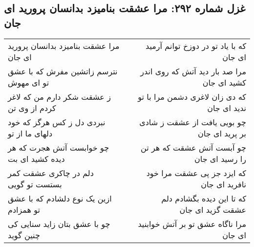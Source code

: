 \begin{center}
\section*{غزل شماره ۲۹۲: مرا عشقت بنامیزد بدانسان پرورید ای جان}
\label{sec:292}
\begin{longtable}{l p{0.5cm} r}
مرا عشقت بنامیزد بدانسان پرورید ای جان
&&
که با یاد تو در دوزخ توانم آرمید ای جان
\\
نترسم زاتشین مفرش که با عشق تو ای مهوش
&&
مرا صد بار دید آتش که روی اندر کشید ای جان
\\
ز عشقت شکر دارم من که لاغر کردم از وی تن
&&
که دی زان لاغری دشمن مرا با تو ندید ای جان
\\
نبردی دل ز کس هرگز که خود دلهای ما از تو
&&
چو بویی یافت از عشقت ز شادی بر پرید ای جان
\\
چو خوابست آتش هجرت که هر دیده کشید ای بت
&&
چو آبست آتش عشقت که هر تن را رسید ای جان
\\
دلم در چاکری عشقت کمر بستست تو گویی
&&
که ایزد جز پی عشقت مرا خود نافرید ای جان
\\
ازین یک نوع دلشادم که با عشق تو همزادم
&&
که تا این دیده بگشادم دلم عشقت گزید ای جان
\\
چو با عشق بتان زاید سنایی کی چنین گوید
&&
مرا ناگاه عشق تو بر آتش خوابنید ای جان
\\
\end{longtable}
\end{center}
